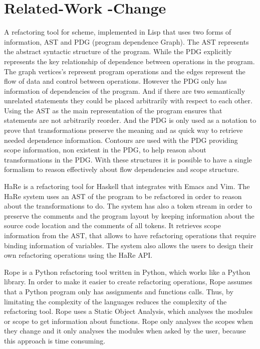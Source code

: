 \section{Related-Work -Change} %
A refactoring tool \cite{griswold1991program} for scheme, implemented in Lisp that
uses two forms of information, AST and PDG (program dependence Graph).
The AST represents the abstract syntactic structure of the program.
While the PDG explicitly represents the key relationship of dependence between
operations in the program. %
The graph vertices's represent program operations and the edges represent the flow of
data and control between operations.
However the PDG only has information of dependencies of the program. And if there
are two semantically unrelated statements they could be placed arbitrarily with
respect to each other.
Using the AST as the main representation of the program ensures that statements
are not arbitrarily reorder.
And the PDG is only used as a notation to prove that transformations preserve
the meaning and as quick way to retrieve needed dependence information.
Contours are used with the PDG providing scope information, non existent in the PDG,
to help reason about transformations in the PDG.
With these structures it is possible to have a single formalism to reason effectively
about flow dependencies and scope structure.

HaRe \cite{thompson2005refactoring} is a refactoring tool for Haskell that
integrates with Emacs and Vim.
The HaRe system uses an AST of the program to be
refactored in order to reason about the transformations to do.
The system has also a token stream in order to preserve the comments and the
program layout by keeping information about the source code location and the comments of all tokens.
It retrieves scope information from the AST, that allows to have refactoring operations that
require binding information of variables. %
The system also allows the users to design their own refactoring operations
using the HaRe API.


Rope is a Python refactoring tool written in Python, which works like a Python library.
In order to make it easier to create refactoring operations, Rope assumes that a
Python program only has assignments and functions calls. %
Thus, by limitating the complexity of the languages reduces the complexity of the
refactoring tool.
Rope uses a Static Object Analysis, which analyses the modules or scope to get
information about functions.
Rope only analyses the scopes when they change and it only analyses the modules
when asked by the user, because this approach is time consuming.

